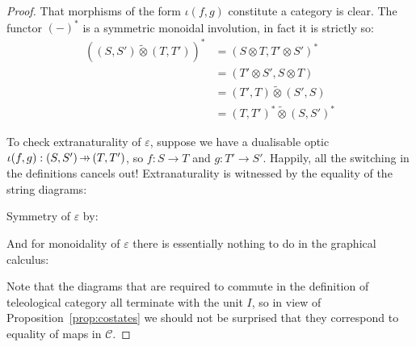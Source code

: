 \documentclass[11pt,letterpaper]{article}
\theoremstyle{plain}
\theoremstyle{definition}
\newcommand{\C}{\mathscr{C}}
\newcommand{\switched}{\mathbin{\tilde{\otimes}}}
\newcommand{\hto}{\ensuremath{\,\mathaccent\shortmid\rightarrow\,}}
\newcommand{\todo}[1]{\textcolor{red}{\small #1}}
\begin{document}
\begin{proof}
  That morphisms of the form $\iota(f, g)$ constitute a category is clear. The functor ${(-)}^*$ is a symmetric monoidal involution, in fact it is strictly so:
  \begin{align*}
    {\left( (S, S') \switched (T, T') \right)}^*
    &= {\left( S \otimes T, T' \otimes S' \right)}^* \\
    &= {\left(T' \otimes S', S \otimes T  \right)} \\
    &= (T', T) \switched (S', S) \\
    &= {(T, T')}^* \switched {(S, S')}^*
  \end{align*}

  To check extranaturality of $\varepsilon$, suppose we have a dualisable optic $\iota(f, g) : (S, S') \hto (T, T')$, so $f : S \to T$ and $g : T' \to S'$. Happily, all the switching in the definitions cancels out! Extranaturality is witnessed by the equality of the string diagrams:
  \begin{center}
    
    \qquad \raisebox{1.5cm}{$=$} \qquad
    
  \end{center}
  Symmetry of $\varepsilon$ by:
  \begin{center}
    
    \qquad \raisebox{1.5cm}{$=$} \qquad
    
  \end{center}
  And for monoidality of $\varepsilon$ there is essentially nothing to do in the graphical calculus:
  \begin{center}
    
    \qquad \raisebox{2cm}{$=$} \qquad
    
  \end{center}

  Note that the diagrams that are required to commute in the definition of teleological category all terminate with the unit $I$, so in view of Proposition~\ref{prop:costates} we should not be surprised that they correspond to equality of maps in $\C$.
\end{proof}

\end{document}
